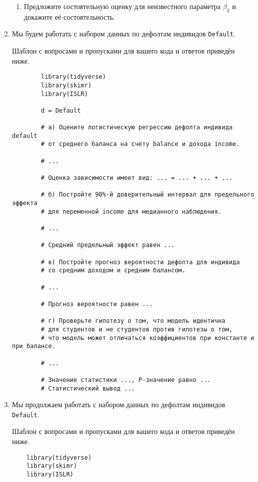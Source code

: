 \documentclass[12pt]{article}
\begin{document}
\begin{enumerate}
\begin{enumerate}
    \item Предложите состоятельную оценку для неизвестного параметра $\beta_2$ и докажите её состоятельность. 
\end{enumerate}

\newpage
    \item Мы будем работать с набором данных по дефолтам индивидов \verb|Default|.

    Шаблон с вопросами и пропусками для вашего кода и ответов приведён ниже. 

    \begin{verbatim}
        library(tidyverse)
        library(skimr)
        library(ISLR)

        d = Default

        # а) Оцените логистическую регрессию дефолта индивида default 
        # от среднего баланса на счету balance и дохода income. 

        # ...

        # Оценка зависимости имеет вид: ... = ... + ... + ...  

        # б) Постройте 90%-й доверительный интервал для предельного эффекта
        # для переменной income для медианного наблюдения.

        # ...

        # Средний предельный эффект равен ...

        # в) Постройте прогноз вероятности дефолта для индивида 
        # со средним доходом и средним балансом. 

        # ...

        # Прогноз вероятности равен ...

        # г) Проверьте гипотезу о том, что модель идентична 
        # для студентов и не студентов против гипотезы о том,
        # что модель может отличаться коэффициентов при константе и при балансе. 

        # ...

        # Значение статистики ..., P-значение равно ... 
        # Статистический вывод ...

    \end{verbatim}

    \newpage
    \item Мы продолжаем работать с набором данных по дефолтам индивидов \verb|Default|.

    Шаблон с вопросами и пропусками для вашего кода и ответов приведён ниже. 

\begin{verbatim}
    library(tidyverse)
    library(skimr)
    library(ISLR)


\end{verbatim}
\end{enumerate}
\end{document}

